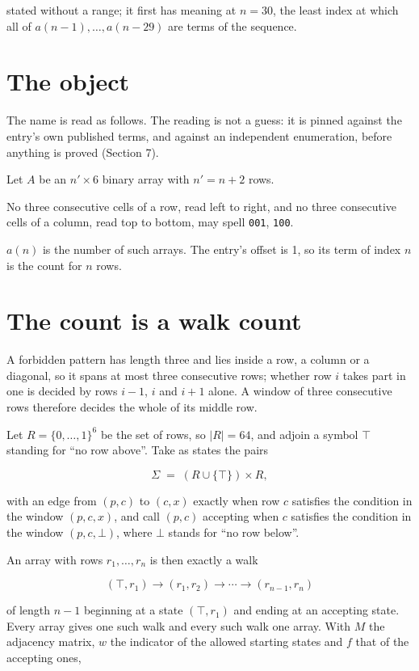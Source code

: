 \documentclass[11pt]{article}
\theoremstyle{definition}
\begin{document}
stated without a range; it first has meaning at $n = 30$, the least index at which all of $a(n-1),\dots,a(n-29)$ are terms of the sequence.

\section{The object}

The name is read as follows. The reading is not a guess: it is pinned against the entry's own published terms, and against an independent enumeration, before anything is proved (Section 7).

Let $A$ be an $n' \times 6$ binary array with $n' = n + 2$ rows.

No three consecutive cells of a row, read left to right, and no three consecutive cells of a column, read top to bottom, may spell \texttt{001}, \texttt{100}.

$a(n)$ is the number of such arrays. The entry's offset is 1, so its term of index $n$ is the count for $n$ rows.

\section{The count is a walk count}

A forbidden pattern has length three and lies inside a row, a column or a diagonal, so it spans at most three consecutive rows; whether row $i$ takes part in one is decided by rows $i-1$, $i$ and $i+1$ alone. A window of three consecutive rows therefore decides the whole of its middle row.

Let $R = \{0,\dots,1\}^{6}$ be the set of rows, so $|R| = 64$, and adjoin a symbol $\top$ standing for ``no row above''. Take as states the pairs

\[\Sigma \;=\; (R \cup \{\top\}) \times R,\]

with an edge from $(p,c)$ to $(c,x)$ exactly when row $c$ satisfies the condition in the window $(p,c,x)$, and call $(p,c)$ accepting when $c$ satisfies the condition in the window $(p,c,\bot)$, where $\bot$ stands for ``no row below''.

An array with rows $r_1,\dots,r_n$ is then exactly a walk

\[(\top,r_1) \to (r_1,r_2) \to \cdots \to (r_{n-1},r_n)\]

of length $n-1$ beginning at a state $(\top,r_1)$ and ending at an accepting state. Every array gives one such walk and every such walk one array. With $M$ the adjacency matrix, $w$ the indicator of the allowed starting states and $f$ that of the accepting ones,
\end{document}

